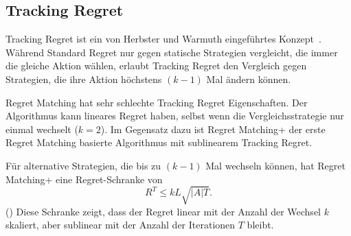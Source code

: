 \subsection{Tracking Regret}

Tracking Regret ist ein von Herbster und Warmuth eingeführtes Konzept~\cite{herbster1998tracking}.
Während Standard Regret nur gegen statische Strategien vergleicht, die immer die gleiche Aktion wählen, erlaubt Tracking Regret den Vergleich gegen Strategien, die ihre Aktion höchstens $(k-1)$ Mal ändern können.

Regret Matching hat sehr schlechte Tracking Regret Eigenschaften.
Der Algorithmus kann lineares Regret haben, selbst wenn die Vergleichsstrategie nur einmal wechselt ($k = 2$).
Im Gegensatz dazu ist Regret Matching+ der erste Regret Matching basierte Algorithmus mit sublinearem Tracking Regret.

Für alternative Strategien, die bis zu $(k-1)$ Mal wechseln können, hat Regret Matching+ eine Regret-Schranke von
\begin{equation}
R^T \le kL\sqrt{|A|T}.
\end{equation}
(\cite[Thm.~2]{tammelin2015solving})
Diese Schranke zeigt, dass der Regret linear mit der Anzahl der Wechsel $k$ skaliert, aber sublinear mit der Anzahl der Iterationen $T$ bleibt.
